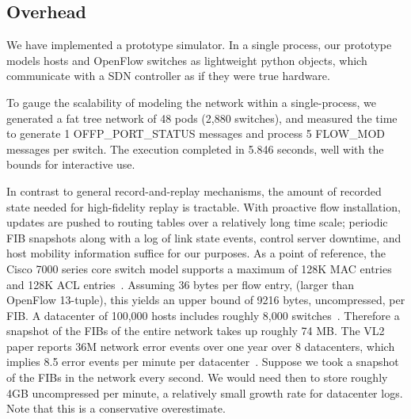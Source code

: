 \subsection{Overhead}

 We have implemented a prototype
simulator. In a single process, our prototype models hosts and OpenFlow switches 
as lightweight python objects, which communicate with a SDN controller as if they were
true hardware.

To gauge the scalability of modeling the network within a single-process,
we generated a fat tree network of 48 pods (2,880 switches), and measured the
time to generate 1 OFFP\_PORT\_STATUS messages and process 5 FLOW\_MOD
messages per switch. The execution completed in 5.846 seconds, well with the
bounds for interactive use.


 In contrast to general record-and-replay
mechanisms, the amount of recorded state needed for
high-fidelity replay is tractable. With proactive flow installation, 
updates are pushed to routing tables over a relatively long time scale; periodic
FIB snapshots along with a log of link state events, control server
downtime, and host mobility information suffice for our purposes. As a point of reference, the Cisco 7000 series
core switch model supports a maximum of 128K MAC entries and
128K ACL entries~\cite{cisco7000}. Assuming 36 bytes per flow entry,
(larger than OpenFlow 13-tuple), this yields
an upper bound of 9216 bytes, uncompressed, per FIB. A datacenter of 100,000
hosts includes roughly 8,000
switches~\cite{Al-Fares:2008:SCD:1402958.1402967}.
Therefore a snapshot of the FIBs of the entire network takes up roughly 74 MB.
The VL2 paper reports 36M network error events over one year over 8
datacenters, which implies 8.5 error events per minute per
datacenter~\cite{Greenberg:2009:VSF:1592568.1592576}.
Suppose we took a snapshot of the FIBs in the network every second. 
We would need then to store roughly 4GB uncompressed per minute, a relatively small growth 
rate for datacenter logs. Note that this is a conservative overestimate.

